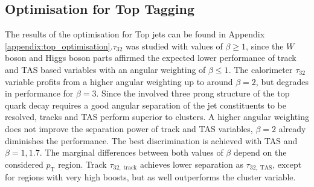 \subsection{Optimisation for Top Tagging}\label{sec:topopt}
The results of the optimisation for Top jets can be found in Appendix \ref{appendix:top_optimisation}.$\tau_{32}$ was studied with values of $\beta \ge 1$,  since the $W$ boson and Higgs boson parts affirmed the expected lower performance of track and TAS based variables with an angular weighting of $\beta \le 1$. The calorimeter $\tau_{32}$ variable profits from a higher angular weighting up to around $\beta=2$, but degrades in performance for $\beta=3$. Since the involved three prong structure of the top quark decay requires a good angular separation of the jet constituents to be resolved, tracks and TAS perform superior to clusters. A higher angular weighting does not improve the separation power of track and TAS variables, $\beta=2$ already diminishes the performance. The best discrimination is achieved with TAS and $\beta=1,1.7$. The marginal differences between both values of $\beta$ depend on the considered $p_{\mathrm{T}}$ region. Track $\tau_{32,\;\text{track}}$ achieves lower separation as $\tau_{32,\;\text{TAS}}$, except for regions with very high boosts, but as well outperforms the cluster variable.

